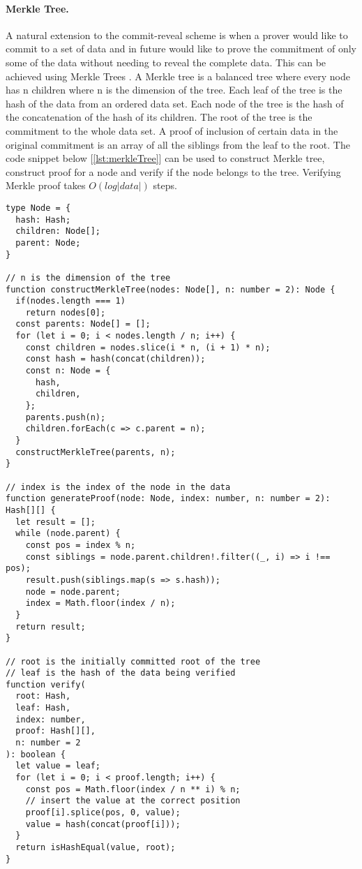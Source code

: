 \documentclass[a4paper,11pt,oneside]{article}
\theoremstyle{definition}
\begin{document}
  \paragraph{Merkle Tree.} A natural extension to the commit-reveal scheme is when a prover would like to commit to a set of data and in future would like to prove the commitment of only some of the data without needing to reveal the complete data. This can be achieved using Merkle Trees \cite{10.1007/3-540-48184-2_32,rfc6962}. A Merkle tree is a balanced tree where every node has n children where n is the dimension of the tree. Each leaf of the tree is the hash of the data from an ordered data set. Each node of the tree is the hash of the concatenation of the hash of its children. The root of the tree is the commitment to the whole data set. A proof of inclusion of certain data in the original commitment is an array of all the siblings from the leaf to the root. The code snippet below [\ref{lst:merkleTree}] can be used to construct Merkle tree, construct proof for a node and verify if the node belongs to the tree. Verifying Merkle proof takes $O(log|data|)$ steps.
  
  \begin{lstlisting}[label = {lst:merkleTree}]
type Node = {
  hash: Hash;
  children: Node[];
  parent: Node;
}
 
// n is the dimension of the tree
function constructMerkleTree(nodes: Node[], n: number = 2): Node {
  if(nodes.length === 1)
    return nodes[0];
  const parents: Node[] = [];
  for (let i = 0; i < nodes.length / n; i++) {
    const children = nodes.slice(i * n, (i + 1) * n);
    const hash = hash(concat(children));
    const n: Node = {
      hash,
      children,
    };
    parents.push(n);
    children.forEach(c => c.parent = n);
  }
  constructMerkleTree(parents, n);
}
 
// index is the index of the node in the data
function generateProof(node: Node, index: number, n: number = 2): Hash[][] {
  let result = [];
  while (node.parent) {
    const pos = index % n;
    const siblings = node.parent.children!.filter((_, i) => i !== pos);
    result.push(siblings.map(s => s.hash));
    node = node.parent;
    index = Math.floor(index / n);
  }
  return result;
} 
  
// root is the initially committed root of the tree
// leaf is the hash of the data being verified
function verify(
  root: Hash,
  leaf: Hash,
  index: number,
  proof: Hash[][],
  n: number = 2
): boolean {
  let value = leaf;
  for (let i = 0; i < proof.length; i++) {
    const pos = Math.floor(index / n ** i) % n;
    // insert the value at the correct position
    proof[i].splice(pos, 0, value);
    value = hash(concat(proof[i]));
  }
  return isHashEqual(value, root);
}
  \end{lstlisting}
  
\end{document}
